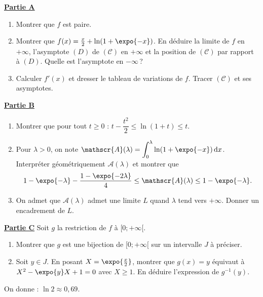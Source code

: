 \underline{\textbf{Partie A}}
\begin{enumerate}
      \item Montrer que $f$ est paire.
      \item Montrer que $f(x) = \frac{x}{2} + \ln(1 + \expo{-x})$. En d\'eduire la limite de $f$ en $+\infty$, l'asymptote $(D)$ de
            $(\mathscr{C})$ en $+\infty$ et la position de $(\mathscr{C})$ par rapport \`a $(D)$. Quelle est l'asymptote en $-\infty$\,?
      \item Calculer $f'(x)$ et dresser le tableau de variations de $f$. Tracer $(\mathscr{C})$ et ses asymptotes.
\end{enumerate}
\underline{\textbf{Partie B}}
\begin{enumerate}
      \item Montrer que pour tout $t \geq 0$ : $t - \dfrac{t^2}{2} \leq \ln(1 + t) \leq t$.
      \item Pour $\lambda > 0$, on note $\mathscr{A}(\lambda) = \displaystyle\int_0^\lambda \ln(1 + \expo{-x})\,\mathrm{d}x$.
            Interpr\'eter g\'eom\'etriquement $\mathscr{A}(\lambda)$ et montrer que
            \[
            1 - \expo{-\lambda} - \frac{1 - \expo{-2\lambda}}{4} \leq \mathscr{A}(\lambda) \leq 1 - \expo{-\lambda} .
            \]
      \item On admet que $\mathscr{A}(\lambda)$ admet une limite $L$ quand $\lambda$ tend vers $+\infty$. Donner un encadrement de $L$.
\end{enumerate}
\underline{\textbf{Partie C}} \newline
Soit $g$ la restriction de $f$ \`a $[0 ; +\infty[$.
\begin{enumerate}
      \item Montrer que $g$ est une bijection de $[0 ; +\infty[$ sur un intervalle $J$ \`a pr\'eciser.
      \item Soit $y \in J$. En posant $X = \expo{\frac{x}{2}}$, montrer que $g(x) = y$ \'equivaut \`a $X^2 - \expo{y} X + 1 = 0$ avec $X \geq 1$.
            En d\'eduire l'expression de $g^{-1}(y)$.
\end{enumerate}
\begin{center}
On donne : $\ln 2 \approx 0{,}69$.
\end{center}

\newpage
